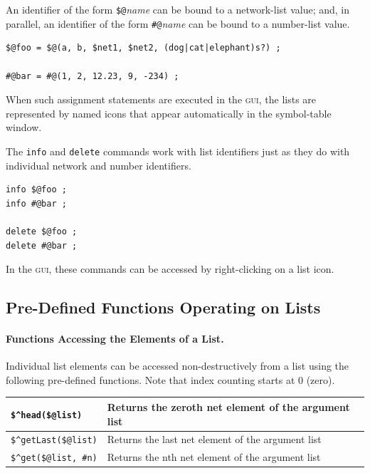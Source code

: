 \documentclass[letterpaper,12pt]{article}
\newcommand{\acro}{\textsc}
\begin{document}
\noindent
An identifier of the form \verb!$@!\emph{name} can be bound to a
network-list value; and, in parallel, an identifier of the form
\verb!#@!\emph{name} can be bound to a number-list value.

\begin{Verbatim}[fontsize=\small]
$@foo = $@(a, b, $net1, $net2, (dog|cat|elephant)s?) ;

#@bar = #@(1, 2, 12.23, 9, -234) ;
\end{Verbatim}

\noindent
When such assignment statements are executed in the \acro{gui}, the lists are
represented by named icons that appear automatically in the symbol-table window.

The \texttt{info} and \texttt{delete} commands work with list identifiers
just as they do with individual network and number identifiers.

\begin{Verbatim}[fontsize=\small]
info $@foo ;
info #@bar ;

delete $@foo ;
delete #@bar ;
\end{Verbatim}

\noindent
In the \acro{gui}, these commands can be accessed by right-clicking on a list
icon.

\subsection{Pre-Defined Functions Operating on Lists}

\paragraph{Functions Accessing the Elements of a List.} 
Individual list
elements can be accessed non-destructively from a list using the
following pre-defined functions.  Note that index counting starts at 0
(zero).

\vspace{.5cm}

\noindent
\begin{tabular}{|l|l|}
\hline
\verb!$^head($@list)! & Returns the zeroth net element of the argument list\\
\hline
\verb!$^getLast($@list)! & Returns the last net element of the argument list\\
\hline
\verb!$^get($@list, #n)! & Returns the nth net element of the argument list\\
\hline
\end{tabular}
\end{document}
